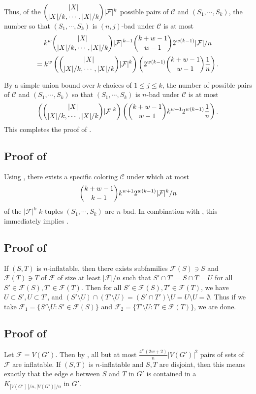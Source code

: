 \documentclass[12pt]{article}
\newcommand{\F}{\mathcal{F}}
\newcommand{\C}{\mathcal{C}}
\begin{document}
Thus, of the $\dbinom{|X|}{|X|/k, \cdots, |X|/k}|\F|^k$ possible pairs of $\C$ and $(S_1, \cdots, S_k)$, the number so that $(S_1, \cdots, S_k)$ is $(n,j)$-bad under $\C$ is at most $$k^w\dbinom{|X|}{|X|/k, \cdots, |X|/k}|\F|^{k-1}\dbinom{k+w-1}{w-1}2^{w(k-1)}|\F|/n$$ $$= k^w\left(\dbinom{|X|}{|X|/k, \cdots, |X|/k}|\F|^k \right)\left(2^{w(k-1)}\dbinom{k+w-1}{w-1}\frac{1}{n}\right).$$

By a simple union bound over $k$ choices of $1 \le j \le k$, the number of possible pairs of $\C$ and $(S_1, \cdots, S_k)$ so that $(S_1, \cdots, S_k)$ is $n$-bad under $\C$ is at most $$\left(\dbinom{|X|}{|X|/k, \cdots, |X|/k}|\F|^k \right)\left(\dbinom{k+w-1}{w-1}k^{w+1}2^{w(k-1)}\frac{1}{n}\right).$$  This completes the proof of .

\subsection{Proof of }

Using , there exists a specific coloring $\C$ under which at most $$\dbinom{k+w-1}{k-1}k^{w+1}2^{w(k-1)}|\F|^k/n$$ of the $|\F|^k$ $k$-tuples $(S_1, \cdots, S_k)$ are $n$-bad.  In combination with , this immediately implies .

\subsection{Proof of } If $(S, T)$ is $n$-inflatable, then there exists subfamilies $\F(S) \ni S$ and $\F(T) \ni T$ of $\F$ of size at least $|\F|/n$ such that $S' \cap T'=S \cap T=U$ for all $S' \in \F(S), T' \in \F(T)$.  Then for all $S' \in \F(S), T' \in \F(T)$, we have $U \subset S', U \subset T'$, and $(S' \setminus U) \cap (T' \setminus U)=(S' \cap T') \setminus U=U \setminus U=\emptyset$.  Thus if we take $\F_1=\{S' \setminus U: S' \in \F(S)\}$ and $\F_2=\{T' \setminus U: T' \in \F(T)\}$, we are done.

\subsection{Proof of }

Let $\F=V(G')$.  Then by , all but at most $\frac{4^w(2w+2)}{n}|V(G')|^2$ pairs of sets of $\F$ are inflatable.  If $(S,T)$ is $n$-inflatable and $S,T$ are disjoint, then this means exactly that the edge $e$ between $S$ and $T$ in $G'$ is contained in a $K_{|V(G')|/n, |V(G')|/n}$ in $G'$.
\end{document}
